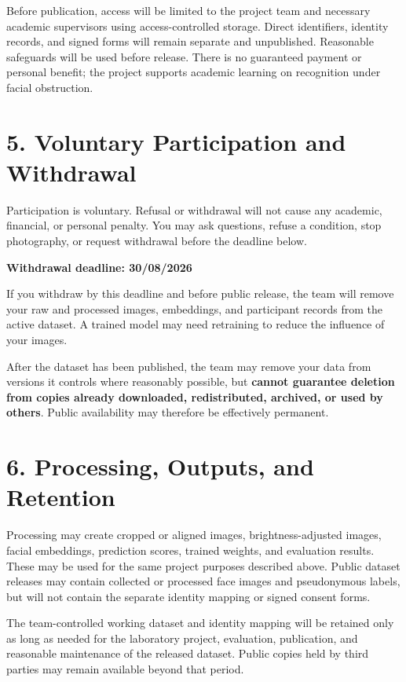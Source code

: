 \documentclass[11pt,a4paper]{article}
\begin{document}
Before publication, access will be limited to the project team and necessary academic supervisors using access-controlled storage. Direct identifiers, identity records, and signed forms will remain separate and unpublished. Reasonable safeguards will be used before release. There is no guaranteed payment or personal benefit; the project supports academic learning on recognition under facial obstruction.

\newpage

\section*{5. Voluntary Participation and Withdrawal}

Participation is voluntary. Refusal or withdrawal will not cause any academic, financial, or personal penalty. You may ask questions, refuse a condition, stop photography, or request withdrawal before the deadline below.

\textbf{Withdrawal deadline: 30/08/2026}

If you withdraw by this deadline and before public release, the team will remove your raw and processed images, embeddings, and participant records from the active dataset. A trained model may need retraining to reduce the influence of your images.

After the dataset has been published, the team may remove your data from versions it controls where reasonably possible, but \textbf{cannot guarantee deletion from copies already downloaded, redistributed, archived, or used by others}. Public availability may therefore be effectively permanent.

\section*{6. Processing, Outputs, and Retention}

Processing may create cropped or aligned images, brightness-adjusted images, facial embeddings, prediction scores, trained weights, and evaluation results. These may be used for the same project purposes described above. Public dataset releases may contain collected or processed face images and pseudonymous labels, but will not contain the separate identity mapping or signed consent forms.

The team-controlled working dataset and identity mapping will be retained only as long as needed for the laboratory project, evaluation, publication, and reasonable maintenance of the released dataset. Public copies held by third parties may remain available beyond that period.
\end{document}
